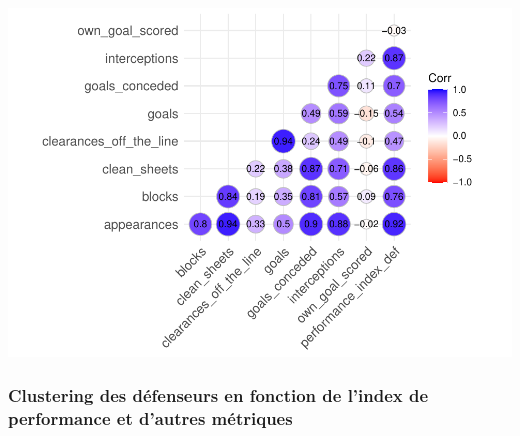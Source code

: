 \documentclass[
  6pt,
]{article}
\begin{document}
\includegraphics[width=0.8\linewidth]{Analyse_Impact_Performances_Joueurs_files/figure-latex/Correlation indexPerformance et diff stat-def-1}

\subsubsection{Clustering des défenseurs en fonction de l'index de
performance et d'autres
métriques}\label{clustering-des-duxe9fenseurs-en-fonction-de-lindex-de-performance-et-dautres-muxe9triques}
\end{document}
